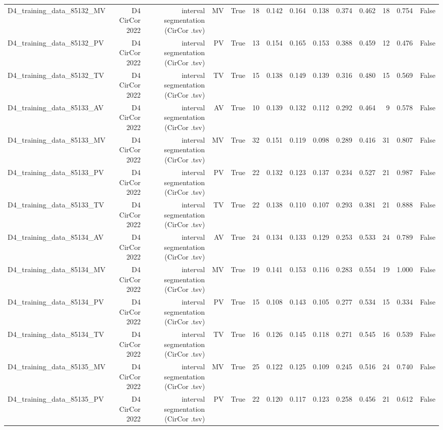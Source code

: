 \begin{table}[htbp]
\begin{tabular}{lrrrrrrrrrrrrr}
    D4\_training\_data\_85132\_MV & D4 CirCor 2022 & interval segmentation (CirCor .tsv) & MV & True & 18 & 0.142 & 0.164 & 0.138 & 0.374 & 0.462 & 18 & 0.754 & False \\
    D4\_training\_data\_85132\_PV & D4 CirCor 2022 & interval segmentation (CirCor .tsv) & PV & True & 13 & 0.154 & 0.165 & 0.153 & 0.388 & 0.459 & 12 & 0.476 & False \\
    D4\_training\_data\_85132\_TV & D4 CirCor 2022 & interval segmentation (CirCor .tsv) & TV & True & 15 & 0.138 & 0.149 & 0.139 & 0.316 & 0.480 & 15 & 0.569 & False \\
    D4\_training\_data\_85133\_AV & D4 CirCor 2022 & interval segmentation (CirCor .tsv) & AV & True & 10 & 0.139 & 0.132 & 0.112 & 0.292 & 0.464 & 9 & 0.578 & False \\
    D4\_training\_data\_85133\_MV & D4 CirCor 2022 & interval segmentation (CirCor .tsv) & MV & True & 32 & 0.151 & 0.119 & 0.098 & 0.289 & 0.416 & 31 & 0.807 & False \\
    D4\_training\_data\_85133\_PV & D4 CirCor 2022 & interval segmentation (CirCor .tsv) & PV & True & 22 & 0.132 & 0.123 & 0.137 & 0.234 & 0.527 & 21 & 0.987 & False \\
    D4\_training\_data\_85133\_TV & D4 CirCor 2022 & interval segmentation (CirCor .tsv) & TV & True & 22 & 0.138 & 0.110 & 0.107 & 0.293 & 0.381 & 21 & 0.888 & False \\
    D4\_training\_data\_85134\_AV & D4 CirCor 2022 & interval segmentation (CirCor .tsv) & AV & True & 24 & 0.134 & 0.133 & 0.129 & 0.253 & 0.533 & 24 & 0.789 & False \\
    D4\_training\_data\_85134\_MV & D4 CirCor 2022 & interval segmentation (CirCor .tsv) & MV & True & 19 & 0.141 & 0.153 & 0.116 & 0.283 & 0.554 & 19 & 1.000 & False \\
    D4\_training\_data\_85134\_PV & D4 CirCor 2022 & interval segmentation (CirCor .tsv) & PV & True & 15 & 0.108 & 0.143 & 0.105 & 0.277 & 0.534 & 15 & 0.334 & False \\
    D4\_training\_data\_85134\_TV & D4 CirCor 2022 & interval segmentation (CirCor .tsv) & TV & True & 16 & 0.126 & 0.145 & 0.118 & 0.271 & 0.545 & 16 & 0.539 & False \\
    D4\_training\_data\_85135\_MV & D4 CirCor 2022 & interval segmentation (CirCor .tsv) & MV & True & 25 & 0.122 & 0.125 & 0.109 & 0.245 & 0.516 & 24 & 0.740 & False \\
    D4\_training\_data\_85135\_PV & D4 CirCor 2022 & interval segmentation (CirCor .tsv) & PV & True & 22 & 0.120 & 0.117 & 0.123 & 0.258 & 0.456 & 21 & 0.612 & False \\

\end{tabular}
\end{table}

